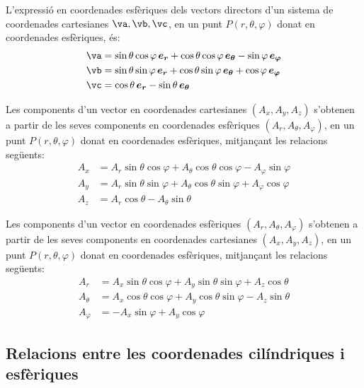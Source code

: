 \documentclass[catalan,a4paper,twoside,11pt]{article}
\begin{document}
L'expressió en coordenades esfèriques dels vectors directors d'un sistema de coordenades  cartesianes $\va,\vb,\vc$, en un punt $P(r,\theta,\varphi)$ donat en coordenades esfèriques, és:
\begin{subequations}\begin{align}
    \va &=\sin\theta\cos\varphi\,\boldsymbol{e_r}+
    \cos\theta\cos\varphi\,\boldsymbol{e_\theta}-\sin\varphi\,\boldsymbol{e_\varphi}\\
    \vb &=\sin\theta\sin\varphi\,\boldsymbol{e_r}+
    \cos\theta\sin\varphi\,\boldsymbol{e_\theta}+\cos\varphi\,\boldsymbol{e_\varphi}\\
    \vc &=\cos\theta\,\boldsymbol{e_r}-\sin\theta\,\boldsymbol{e_\theta}
\end{align}\end{subequations}

Les components d'un vector en coordenades cartesianes $(A_x, A_y, A_z)$ s'obtenen a partir de les seves components en coordenades esfèriques $(A_r, A_\theta, A_\varphi)$, en un punt $P(r,\theta,\varphi)$ donat en coordenades esfèriques, mitjançant les relacions següents:
\begin{subequations}\begin{align}
    A_x &= A_r\sin\theta\cos\varphi+A_\theta\cos\theta\cos\varphi-A_\varphi\sin\varphi \\
    A_y &= A_r\sin\theta\sin\varphi+A_\theta\cos\theta\sin\varphi+A_\varphi\cos\varphi\\
    A_z &= A_r\cos\theta-A_\theta\sin\theta
\end{align}\end{subequations}

Les components d'un vector en coordenades esfèriques $(A_r, A_\theta, A_\varphi)$ s'obtenen a partir de les seves components en coordenades cartesianes $(A_x, A_y, A_z)$, en un punt $P(r,\theta,\varphi)$ donat en coordenades esfèriques, mitjançant les relacions següents:
\begin{subequations}\begin{align}
    A_r &=  A_x\sin\theta\cos\varphi+A_y\sin\theta\sin\varphi+A_z\cos\theta\\
    A_\theta &=  A_x\cos\theta\cos\varphi+A_y\cos\theta\sin\varphi-A_z\sin\theta\\
    A_\varphi &= -A_x\sin\varphi+A_y\cos\varphi
\end{align}\end{subequations}


\subsection{Relacions entre les coordenades cilíndriques i
esfèriques}
\end{document}
